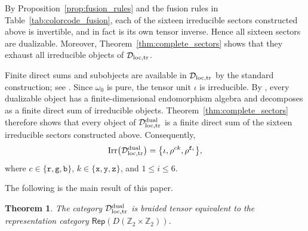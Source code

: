 \documentclass[a4paper,11pt]{article}
\newtheorem{theorem}{Theorem}[section]
\theoremstyle{definition}
\theoremstyle{remark}
\theoremstyle{remark}
\newcommand\Rep {\mathsf{Rep}}
\begin{document}
By Proposition~\ref{prop:fusion_rules} and the fusion rules in Table~\ref{tab:colorcode_fusion}, each of the sixteen irreducible sectors constructed above is invertible, and in fact is its own tensor inverse. Hence all sixteen sectors are dualizable. Moreover, Theorem~\ref{thm:complete_sectors} shows that they exhaust all irreducible objects of $\mathcal D_{\rm loc,tr}$.

Finite direct sums and subobjects are available in $\mathcal D_{\rm loc,tr}$ by the standard construction; see \cite{Ogata2022braided}. Since $\omega_0$ is pure, the tensor unit $\iota$ is irreducible. By \cite[Lemma~3.2]{Longo1997dimension}, every dualizable object has a finite-dimensional endomorphism algebra and decomposes as a finite direct sum of irreducible objects. Theorem~\ref{thm:complete_sectors} therefore shows that every object of $\mathcal D_{\rm loc,tr}^{\rm dual}$ is a finite direct sum of the sixteen irreducible sectors constructed above. Consequently,
\[
    \operatorname{Irr}\bigl(\mathcal D_{\rm loc,tr}^{\rm dual}\bigr) = \bigl\{\iota,\rho^{ck},\rho^{\mathtt f_i}\bigr\},
\]
where $c\in\{\mathtt r,\mathtt g,\mathtt b\}$, $k\in\{\mathtt x,\mathtt y,\mathtt z\}$, and $1\leq i\leq6$.


The following is the main result of this paper.

\begin{theorem}\label{thm:category_equivalence}
    The category $\mathcal D_{\rm loc,tr}^{\rm dual}$ is braided tensor equivalent to the representation category $\Rep(D(\mathbb{Z}_2\times \mathbb{Z}_2))$.
\end{theorem}
\end{document}
